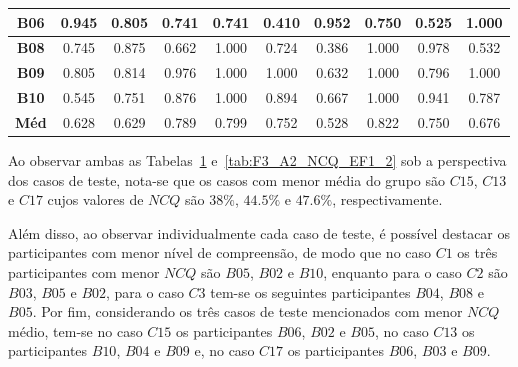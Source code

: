 \begin{table}[htbp]
\begin{tabular}{|c|ccccccccc|}
		\textbf{B06} & \multicolumn{1}{c|}{0.945} & \multicolumn{1}{c|}{0.805} & \multicolumn{1}{c|}{0.741} & \multicolumn{1}{c|}{0.741} & \multicolumn{1}{c|}{0.410} & \multicolumn{1}{c|}{0.952} & \multicolumn{1}{c|}{0.750} & \multicolumn{1}{c|}{0.525} & 1.000 \\ \hline
		\rowcolor[HTML]{F2F2F2} 
		\textbf{B08} & \multicolumn{1}{c|}{\cellcolor[HTML]{F2F2F2}0.745} & \multicolumn{1}{c|}{\cellcolor[HTML]{F2F2F2}0.875} & \multicolumn{1}{c|}{\cellcolor[HTML]{F2F2F2}0.662} & \multicolumn{1}{c|}{\cellcolor[HTML]{F2F2F2}1.000} & \multicolumn{1}{c|}{\cellcolor[HTML]{F2F2F2}0.724} & \multicolumn{1}{c|}{\cellcolor[HTML]{F2F2F2}0.386} & \multicolumn{1}{c|}{\cellcolor[HTML]{F2F2F2}1.000} & \multicolumn{1}{c|}{\cellcolor[HTML]{F2F2F2}0.978} & 0.532 \\ \hline
		\textbf{B09} & \multicolumn{1}{c|}{0.805} & \multicolumn{1}{c|}{0.814} & \multicolumn{1}{c|}{0.976} & \multicolumn{1}{c|}{1.000} & \multicolumn{1}{c|}{1.000} & \multicolumn{1}{c|}{0.632} & \multicolumn{1}{c|}{1.000} & \multicolumn{1}{c|}{0.796} & 1.000 \\ \hline
		\rowcolor[HTML]{F2F2F2} 
		\textbf{B10} & \multicolumn{1}{c|}{\cellcolor[HTML]{F2F2F2}0.545} & \multicolumn{1}{c|}{\cellcolor[HTML]{F2F2F2}0.751} & \multicolumn{1}{c|}{\cellcolor[HTML]{F2F2F2}0.876} & \multicolumn{1}{c|}{\cellcolor[HTML]{F2F2F2}1.000} & \multicolumn{1}{c|}{\cellcolor[HTML]{F2F2F2}0.894} & \multicolumn{1}{c|}{\cellcolor[HTML]{F2F2F2}0.667} & \multicolumn{1}{c|}{\cellcolor[HTML]{F2F2F2}1.000} & \multicolumn{1}{c|}{\cellcolor[HTML]{F2F2F2}0.941} & 0.787 \\ \hline
		\textbf{Méd} & \multicolumn{1}{c|}{0.628} & \multicolumn{1}{c|}{0.629} & \multicolumn{1}{c|}{0.789} & \multicolumn{1}{c|}{0.799} & \multicolumn{1}{c|}{0.752} & \multicolumn{1}{c|}{0.528} & \multicolumn{1}{c|}{0.822} & \multicolumn{1}{c|}{0.750} & 0.676 \\ \hline
	\end{tabular}
	\label{tab:F3_A2_NCQ_EF1}
\end{table}

Ao observar ambas as Tabelas~\ref{tab:F3_A2_NCQ_EF1} e~\ref{tab:F3_A2_NCQ_EF1_2} sob a perspectiva dos casos de teste, nota-se que os casos com menor média do grupo são $C15$, $C13$ e $C17$ cujos valores de $NCQ$ são $38\%$, $44.5\%$ e $47.6\%$, respectivamente.

Além disso, ao observar individualmente cada caso de teste, é possível destacar os participantes com menor nível de compreensão, de modo que no caso $C1$ os três participantes com menor $NCQ$ são $B05$, $B02$ e $B10$, enquanto para o caso $C2$ são $B03$, $B05$ e $B02$, para o caso $C3$ tem-se os seguintes participantes $B04$, $B08$ e $B05$. Por fim, considerando os três casos de teste mencionados com menor $NCQ$ médio, tem-se no caso $C15$ os participantes $B06$, $B02$ e $B05$, no caso $C13$ os participantes $B10$, $B04$ e $B09$ e, no caso $C17$ os participantes $B06$, $B03$ e $B09$. 

